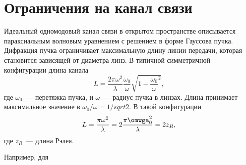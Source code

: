 \section{Ограничения на канал связи}
Идеальный одномодовый канал связи в открытом пространстве описывается параксиальным волновым уравнением с решением в форме Гауссова пучка. 
Дифракция пучка ограничивает максимальную длину линии передачи, которая становится зависящей от диаметра линз. 
В типичной симметричной конфигурации длина канала
\begin{equation*}
  L = \frac{2\pi\omega^2}{\lambda} \frac{\omega_0}{\omega} \sqrt{1 - \frac{\omega_0}{\omega}^2},
\end{equation*}
где $\omega_0$~--- перетяжка пучка, и $\omega$~--- радиус пучка в линзах.
Длина принимает максимальное значение в $\omega_0 / \omega = 1 / sqrt{2}$. В такой конфигурации
\begin{equation*}
  L = \frac{\pi\omega^2}{\lambda} = 2 \frac{\pi\omwga^2_0}{\lambda} = 2z_R,
\end{equation*}
где $z_R$~--- длина Рэлея.

Например, для 